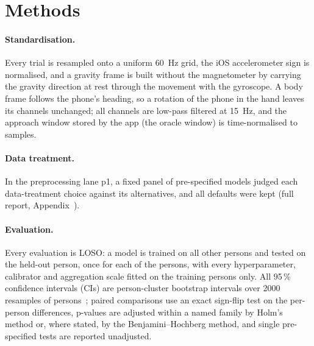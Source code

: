 \section{Methods}\label{sec:methods}

\paragraph{Standardisation.} Every trial is resampled onto a uniform 60~Hz grid, the iOS accelerometer sign is
normalised, and a gravity frame is built without the magnetometer by carrying the gravity direction at rest through
the movement with the gyroscope. A body frame follows the phone's heading, so a rotation of the phone in the hand
leaves its channels unchanged; all channels are low-pass filtered at 15~Hz, and the approach window stored by the app
(the oracle window) is time-normalised to  samples.

\paragraph{Data treatment.} In the preprocessing lane p1, a fixed panel of pre-specified models judged each
data-treatment choice against its alternatives, and all  defaults were kept (full report,
Appendix~).

\paragraph{Evaluation.} Every evaluation is LOSO: a model is trained on all other persons and tested on the held-out
person, once for each of the  persons, with every hyperparameter, calibrator and aggregation
scale fitted on the training persons only. All 95\,\% confidence intervals (CIs) are person-cluster bootstrap
intervals over 2000 resamples of persons~\cite{saravanan2020bootstrap}; paired comparisons use an exact sign-flip
test on the per-person differences, p-values are adjusted within a named family by Holm's method or, where stated,
by the Benjamini--Hochberg method, and single pre-specified tests are reported unadjusted.

